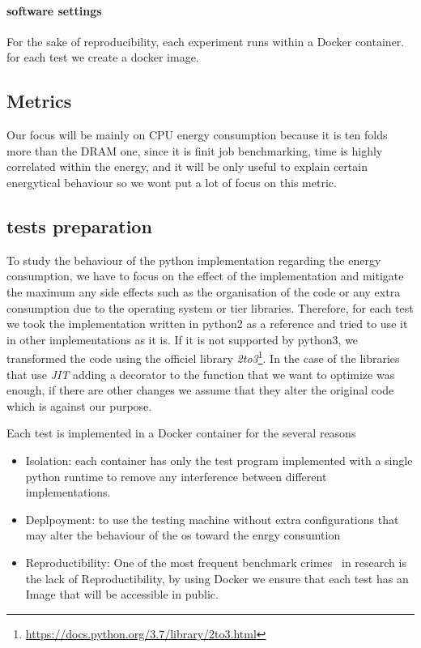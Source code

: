 \paragraph{software settings}
For the sake of reproducibility, each experiment runs within a Docker container.
for each test we create a docker image.
\subsection{Metrics}
Our focus will be mainly on CPU energy consumption because it is ten folds more than the DRAM one, since it is finit job benchmarking, time is highly correlated within the energy, and it will be only useful to explain certain energytical behaviour so we wont put a lot of focus on this metric.



\subsection{tests preparation}



To study the behaviour of the python implementation regarding the energy consumption, we have to focus on the effect of the implementation and mitigate the maximum any side effects such as the organisation of the code or any extra consumption due to the operating system or tier libraries.
Therefore, for each test we took the implementation written in python2 as a reference and tried to use it in other implementations as it is. If it is not supported by python3, we transformed the code using the officiel library  \emph{2to3}\footnote{\url{https://docs.python.org/3.7/library/2to3.html}}.
In the case of the libraries that use \emph{JIT} adding a decorator to the function that we want to optimize was enough, if there are other changes we assume that they alter the original code which is against our purpose.

Each test is implemented in a Docker container for the several reasons
\begin{itemize}
    \item Isolation: each container has only the test program implemented with a single python runtime to remove any interference between different implementations.
    \item Deplpoyment: to use the testing machine without extra configurations that may alter the behaviour of the os toward the enrgy consumtion
    \item Reproductibility: One of the most frequent benchmark crimes~\cite{DBLP:journals/corr/abs-1801-02381} in research is the lack of Reproductibility, by using Docker we ensure that each test has an Image that will be accessible in public.
\end{itemize}

